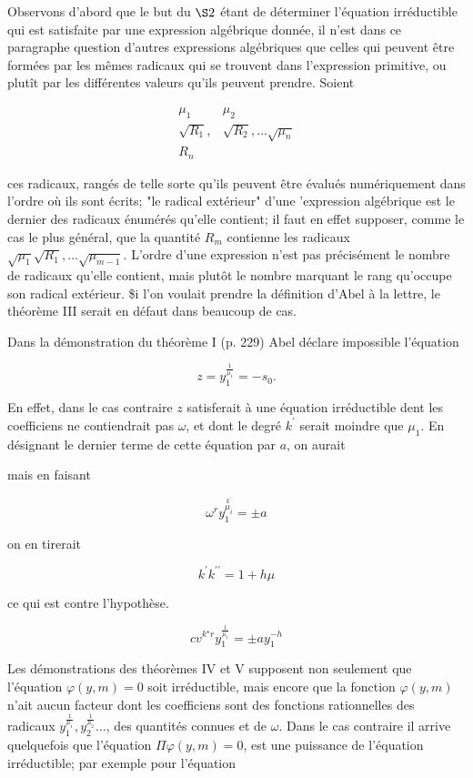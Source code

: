 \documentclass{article}
\begin{document}
Observons d'abord que le but du \(\S 2\) étant de déterminer l'équation irréductible qui est satisfaite par une expression algébrique donnée, il n'est dans ce paragraphe question d'autres expressions algébriques que celles qui peuvent être formées par les mêmes radicaux qui se trouvent dans l'expression primitive, ou plutît par les différentes valeurs qu'ils peuvent prendre. Soient

\[
\begin{array}{ll}
\mu_{1} & \mu_{2} \\
\sqrt{R_{1}}, & \sqrt{R_{2}}, \ldots \sqrt{\mu_{n}} \\
R_{n}
\end{array}
\]

ces radicaux, rangés de telle sorte qu'ils peuvent être évalués numériquement dans l'ordre où ils sont écrits; "le radical extérieur" d'une 'expression algébrique est le dernier des
radicaux énumérés qu'elle contient; il faut en effet supposer, comme le cas le plus général, que la quantité \(R_{m}\) contienne les radicaux \(\sqrt{\mu_{1}} \sqrt{R_{1}}, \ldots \sqrt{\mu_{m-1}}\). L'ordre d'une expression n'est pas précisément le nombre de radicaux qu'elle contient, mais plutôt le nombre marquant le rang qu'occupe son radical extérieur. \$i l'on voulait prendre la définition d'Abel à la lettre, le théorème III serait en défaut dans beaucoup de cas.

Dans la démonstration du théorème I (p. 229) Abel déclare impossible l'équation

\[
z=y_{1}^{\frac{1}{\mu_{1}}}=-s_{0} .
\]

En effet, dans le cas contraire \(z\) satisferait à une équation irréductible dent les coefficiens ne contiendrait pas \(\omega\), et dont le degré \(k^{\prime}\) serait moindre que \(\mu_{1}\). En désignant le dernier terme de cette équation par \(a\), on aurait

mais en faisant

\[
\omega^{r} y_{1}^{\stackrel{k^{\prime}}{\mu_{i}}}= \pm a
\]

on en tirerait

\[
k^{\prime} k^{\prime \prime}=1+h \mu
\]

ce qui est contre l'hypothèse.

\[
c v^{k^{\star} r} y_{1}^{\frac{1}{\mu_{1}}}= \pm a y_{1}^{-h}
\]

Les démonstrations des théorèmes IV et \(\mathrm{V}\) supposent non seulement que l'équation \(\varphi(y, m)=0\) soit irréductible, mais encore que la fonction \(\varphi(y, m)\) n'ait aucun facteur dont les coefficiens sont des fonctions rationnelles des radicaux \(y_{1}^{\frac{1}{\mu_{1}}}, y_{2}^{\frac{1}{\mu_{2}}} \ldots\), des quantités connues et de \(\omega\). Dans le cas contraire il arrive quelquefois que l'équation \(\Pi \varphi(y, m)=0\), est une puissance de l'équation irréductible; par exemple pour l'équation
\end{document}
